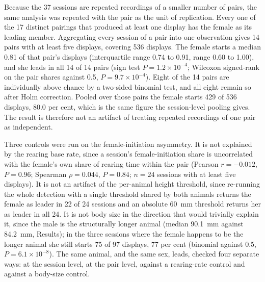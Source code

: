 \documentclass[pdflatex, sn-nature]{sn-jnl}
\theoremstyle{thmstyleone}%
\theoremstyle{thmstyletwo}%
\theoremstyle{thmstylethree}%
\begin{document}
Because the 37 sessions are repeated recordings of a smaller number of pairs, the same analysis was repeated with the pair as the unit of replication. Every one of the 17 distinct pairings that produced at least one display has the female as its leading member. Aggregating every session of a pair into one observation gives 14 pairs with at least five displays, covering 536 displays. The female starts a median 0.81 of that pair's displays (interquartile range 0.74 to 0.91, range 0.60 to 1.00), and she leads in all 14 of 14 pairs (sign test $P = 1.2 \times 10^{-4}$; Wilcoxon signed-rank on the pair shares against 0.5, $P = 9.7 \times 10^{-4}$). Eight of the 14 pairs are individually above chance by a two-sided binomial test, and all eight remain so after Holm correction. Pooled over those pairs the female starts 429 of 536 displays, 80.0 per cent, which is the same figure the session-level pooling gives. The result is therefore not an artifact of treating repeated recordings of one pair as independent.

Three controls were run on the female-initiation asymmetry. It is not explained by the rearing base rate, since a session's female-initiation share is uncorrelated with the female's own share of rearing time within the pair (Pearson $r = -0.012$, $P = 0.96$; Spearman $\rho = 0.044$, $P = 0.84$; $n = 24$ sessions with at least five displays). It is not an artifact of the per-animal height threshold, since re-running the whole detection with a single threshold shared by both animals returns the female as leader in 22 of 24 sessions and an absolute 60~mm threshold returns her as leader in all 24. It is not body size in the direction that would trivially explain it, since the male is the structurally longer animal (median 90.1~mm against 84.2~mm, Results); in the three sessions where the female happens to be the longer animal she still starts 75 of 97 displays, 77 per cent (binomial against 0.5, $P = 6.1 \times 10^{-8}$). The same animal, and the same sex, leads, checked four separate ways: at the session level, at the pair level, against a rearing-rate control and against a body-size control.
\end{document}
